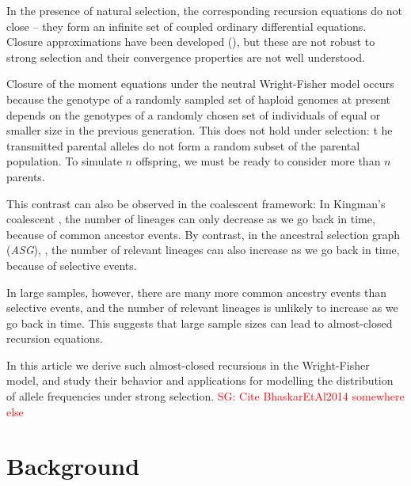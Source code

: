 \documentclass[review]{elsarticle}
\newcommand{\sgcomment}[1]{\textcolor{red}{SG: #1}}
\begin{document}
In the presence of natural selection, the corresponding recursion equations do not close
\citep{Donnelly, JouganousEtAl2017} -- they form an infinite set of coupled ordinary differential
equations. Closure approximations have been developed (\citep{JouganousEtAl2017}), but these are not
robust to strong selection and their convergence properties are not well understood.

Closure of the moment equations under the neutral Wright-Fisher model occurs
 because the genotype of a randomly sampled set of haploid genomes at present
  depends on the genotypes of a randomly chosen set of individuals of equal
 or smaller size in the previous generation. This does not hold under selection: t
 he transmitted parental alleles do not form a random subset of the parental population. 
 To simulate $n$ offspring, we must be ready to consider more than $n$ parents. 
 
 This contrast can also be observed in the coalescent framework: 
 In Kingman's coalescent \citep{Kingman1982a}, the number of lineages can only decrease 
 as we go back in time, because of common ancestor events. By contrast, in the
  ancestral selection graph (\textit{ASG}), \citep{KroneNeuhauser1997}, the number of
  relevant lineages can also increase as we go back in time, because of selective events. 
 
 In large samples, however, there are many more common ancestry events than selective 
 events, and the number of relevant lineages is unlikely to increase as we go back in time. 
 This suggests that large sample sizes can lead to almost-closed recursion equations.  
 
In this article we derive such almost-closed recursions in the Wright-Fisher model, and study their behavior and applications for modelling the distribution of allele frequencies under strong selection. 
\sgcomment{Cite BhaskarEtAl2014 somewhere else}
 
 
 
  




\section{Background}
\label{sec:background}
\end{document}
